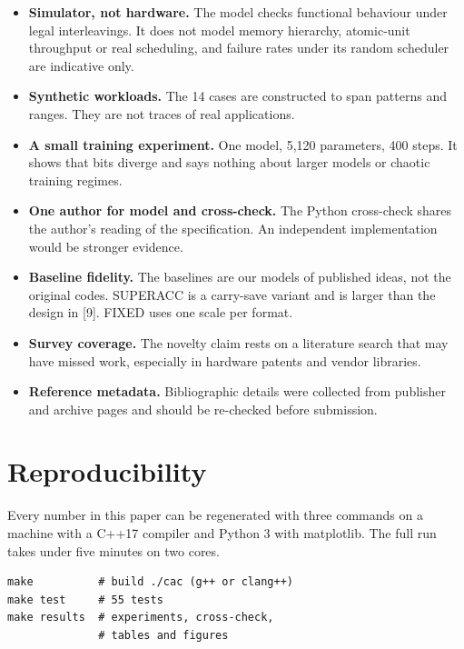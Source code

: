 \documentclass[3p,10pt]{elsarticle}
\begin{document}
\begin{itemize}
\item
  \textbf{Simulator, not hardware.} The model checks functional
  behaviour under legal interleavings. It does not model memory
  hierarchy, atomic-unit throughput or real scheduling, and failure
  rates under its random scheduler are indicative only.
\item
  \textbf{Synthetic workloads.} The 14 cases are constructed to span
  patterns and ranges. They are not traces of real applications.
\item
  \textbf{A small training experiment.} One model, 5,120 parameters, 400
  steps. It shows that bits diverge and says nothing about larger models
  or chaotic training regimes.
\item
  \textbf{One author for model and cross-check.} The Python cross-check
  shares the author's reading of the specification. An independent
  implementation would be stronger evidence.
\item
  \textbf{Baseline fidelity.} The baselines are our models of published
  ideas, not the original codes. SUPERACC is a carry-save variant and is
  larger than the design in {[}9{]}. FIXED uses one scale per format.
\item
  \textbf{Survey coverage.} The novelty claim rests on a literature
  search that may have missed work, especially in hardware patents and
  vendor libraries.
\item
  \textbf{Reference metadata.} Bibliographic details were collected from
  publisher and archive pages and should be re-checked before
  submission.
\end{itemize}

\hypertarget{reproducibility}{%
\section{Reproducibility}\label{reproducibility}}

Every number in this paper can be regenerated with three commands on a
machine with a C++17 compiler and Python 3 with matplotlib. The full run
takes under five minutes on two cores.

\begin{lstlisting}
make          # build ./cac (g++ or clang++)
make test     # 55 tests
make results  # experiments, cross-check,
              # tables and figures
\end{lstlisting}
\end{document}
